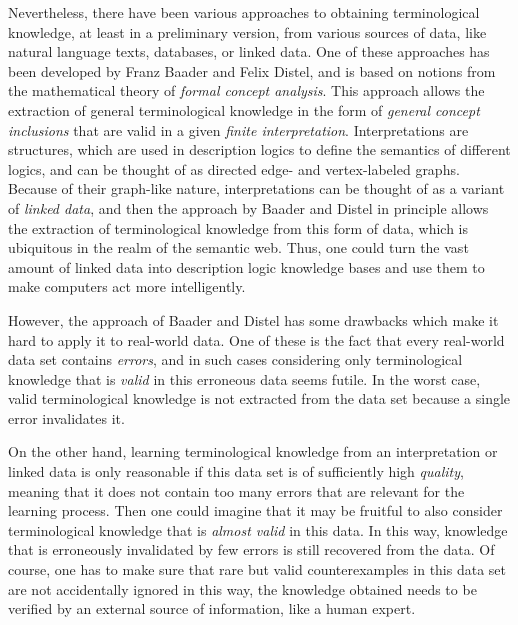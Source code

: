 Nevertheless, there have been various approaches to obtaining terminological knowledge, at
least in a preliminary version, from various sources of data, like natural language texts,
databases, or linked data.  One of these approaches has been developed by Franz Baader and
Felix Distel, and is based on notions from the mathematical theory of \emph{formal concept
  analysis}.  This approach allows the extraction of general terminological knowledge in
the form of \emph{general concept inclusions} that are valid in a given \emph{finite
  interpretation}.  Interpretations are structures, which are used in description logics
to define the semantics of different logics, and can be thought of as directed edge- and
vertex-labeled graphs.  Because of their graph-like nature, interpretations can be thought
of as a variant of \emph{linked data}, and then the approach by Baader and Distel in
principle allows the extraction of terminological knowledge from this form of data, which
is ubiquitous in the realm of the semantic web.  Thus, one could turn the vast amount of
linked data into description logic knowledge bases and use them to make computers act more
intelligently.

However, the approach of Baader and Distel has some drawbacks which make it hard to apply
it to real-world data.  One of these is the fact that every real-world data set contains
\emph{errors}, and in such cases considering only terminological knowledge that is
\emph{valid} in this erroneous data seems futile.  In the worst case, valid terminological
knowledge is not extracted from the data set because a single error invalidates it.

On the other hand, learning terminological knowledge from an interpretation or linked data
is only reasonable if this data set is of sufficiently high \emph{quality}, meaning that
it does not contain too many errors that are relevant for the learning process.  Then one
could imagine that it may be fruitful to also consider terminological knowledge that is
\emph{almost valid} in this data.  In this way, knowledge that is erroneously invalidated
by few errors is still recovered from the data.  Of course, one has to make sure that rare
but valid counterexamples in this data set are not accidentally ignored in this way, \ie
the knowledge obtained needs to be verified by an external source of information, like a
human expert.

